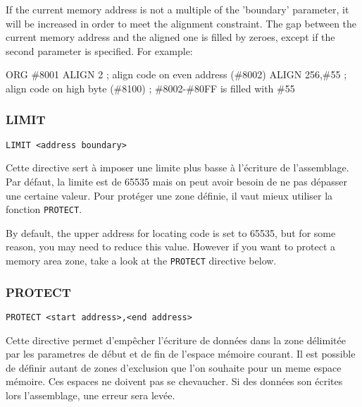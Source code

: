 \begin{xen}
If the current memory address is not a multiple of the 'boundary' parameter, it will be increased in order to meet the alignment constraint.
The gap between the current memory address and the aligned one is filled by zeroes, except if the second parameter is specified. For example:
\end{xen}

\begin{code}
ORG \#8001
ALIGN 2       ; align code on even address (\#8002)
ALIGN 256,\#55 ; align code on high byte (\#8100)
; \#8002-\#80FF is filled with \#55
\end{code}

\subsubsection{LIMIT}
\begin{verbatim}
LIMIT <address boundary>
\end{verbatim}

\begin{xfr}
Cette directive sert à imposer une limite plus basse à l'écriture de l'assemblage.
Par défaut, la limite est de 65535 mais on peut avoir besoin de ne pas dépasser une certaine valeur.
Pour protéger une zone définie, il vaut mieux utiliser la fonction \texttt{PROTECT}.
\end{xfr}

\begin{xen}
By default, the upper address for locating code is set to 65535, but for some reason, you may need to
reduce this value.
However if you want to protect a memory area zone, take a look at the \texttt{PROTECT} directive below.
\end{xen}

\subsubsection{PROTECT}
\begin{verbatim}
PROTECT <start address>,<end address>
\end{verbatim}

\begin{xfr}
Cette directive permet d'empêcher l'écriture de données dans la zone délimitée par les parametres de début et de fin de l'espace mémoire courant.
Il est possible de définir autant de zones d'exclusion que l'on souhaite pour un meme espace mémoire. Ces espaces ne doivent pas se chevaucher.
Si des données son écrites lors l'assemblage, une erreur sera levée.
\end{xfr}

